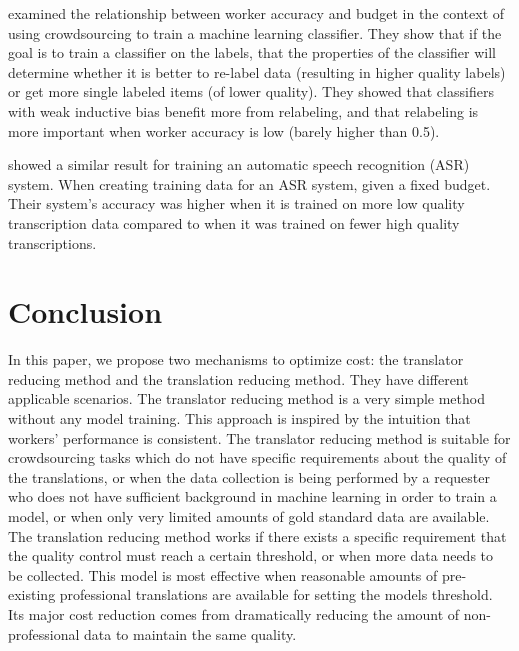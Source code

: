 \documentclass[11pt,letterpaper]{article}
\begin{document}
 examined the relationship between worker accuracy and budget in the context of using crowdsourcing to train a machine learning classifier.  They show that if the goal is to train a classifier on the labels, that the properties of the classifier will determine whether it is better to re-label data (resulting in higher quality labels) or get more single labeled items (of lower quality). They showed that classifiers with weak inductive bias  benefit more from relabeling, and that relabeling is more important when worker accuracy is low (barely higher than 0.5). 

 showed a similar result for training an automatic speech recognition (ASR) system.  When creating training data for an ASR system, given a fixed budget. Their system's accuracy was higher when it is trained on more low quality transcription data compared to when it was trained on fewer high quality transcriptions.


\section{Conclusion}
In this paper, we propose two mechanisms to optimize cost: the translator reducing method and the translation reducing method. They have  different applicable scenarios. The translator reducing method is a very simple method without any model training. This approach is inspired by the intuition that workers' performance is consistent. The translator reducing method is suitable for crowdsourcing tasks which do not have specific requirements about the quality of the translations, or when the data collection is being performed by a requester who does not have sufficient background in machine learning in order to train a model, or when only very limited amounts of gold standard data are available.
The translation reducing method works if there exists a specific requirement that the quality control must reach a certain threshold, or when more data needs to be collected.  This model is most effective when reasonable amounts of pre-existing professional translations are available for setting the models threshold.  Its major cost reduction comes from dramatically reducing the amount of non-professional data to maintain the same quality.
\end{document}
